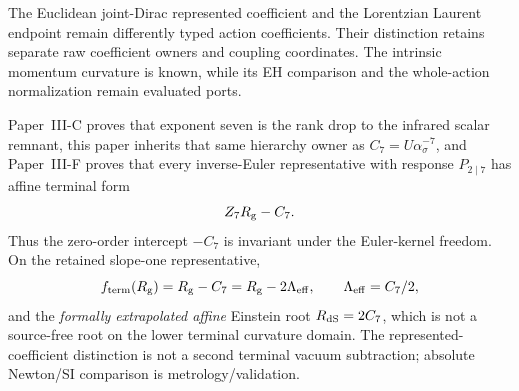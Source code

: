 \documentclass[12pt,a4paper]{article}
\begin{document}
The Euclidean joint-Dirac represented coefficient and the Lorentzian Laurent
endpoint remain differently typed action coefficients.  Their distinction retains separate raw coefficient owners and coupling
coordinates. The intrinsic momentum curvature is known, while its EH
comparison and the whole-action normalization remain evaluated ports.

Paper~III-C proves that exponent seven is the rank drop
to the infrared scalar remnant, this paper inherits that same hierarchy owner
as \(C_7=U\alpha_\sigma^{-7}\), and Paper~III-F proves that every inverse-Euler
representative with response \(P_{2\mid7}\) has affine terminal form
\[
 Z_7R_{\rm g}-C_7.
\]
Thus the zero-order intercept \(-C_7\) is invariant under the Euler-kernel
freedom.  On the retained slope-one representative,
\[
 f_{\rm term}(R_{\rm g})=R_{\rm g}-C_7
 =R_{\rm g}-2\Lambda_{\rm eff},\qquad
 \Lambda_{\rm eff}=C_7/2,
\]
and the \emph{formally extrapolated affine} Einstein root \(R_{\rm dS}=2C_7\), which is not a source-free root on the lower terminal curvature domain.  The represented-coefficient distinction is not a
second terminal vacuum subtraction; absolute Newton/SI comparison is
metrology/validation.
\end{document}
